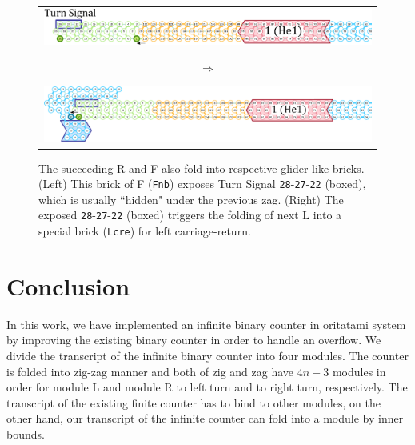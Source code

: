 \documentclass[twocolumn]{svjour3}
\begin{document}
\begin{figure}[tb]
\centering
\begin{tabular}{c}
 \begin{minipage}{0.45\linewidth}
 
\centering
\includegraphics[width=\linewidth]{fig/svg/CounterEx17_3.pdf}

\end{minipage}
\begin{minipage}{0.05\linewidth}
\centering
{\large $\Rightarrow$}
\end{minipage}
 \begin{minipage}{0.5\linewidth}

\centering
\includegraphics[width=\linewidth]{fig/svg/CounterEx18_2.pdf}

\end{minipage}
\end{tabular}

\caption{
The succeeding R and F also fold into respective glider-like bricks.
(Left) This brick of F (\texttt{Fnb}) exposes Turn Signal \texttt{28}{-}\texttt{27}{-}\texttt{22} (boxed), which is usually ``hidden" under the previous zag.
(Right) The exposed \texttt{28}{-}\texttt{27}{-}\texttt{22} (boxed) triggers the folding of next L into a special brick (\texttt{Lcre}) for left carriage-return.
}
\label{fig:overflowex4}
\end{figure}

\section{Conclusion}
In this work, we have implemented an infinite binary counter in oritatami system by improving the existing binary counter in order to handle an overflow.
We divide the transcript of the infinite binary counter into four modules.
The counter is folded into zig-zag manner and both of zig and zag have $4n{-}3$ modules in order for module L and module R to left turn and to right turn, respectively.
The transcript of the existing finite counter has to bind to other modules, on the other hand, our transcript of the infinite counter can fold into a module by inner bounds.
\end{document}
